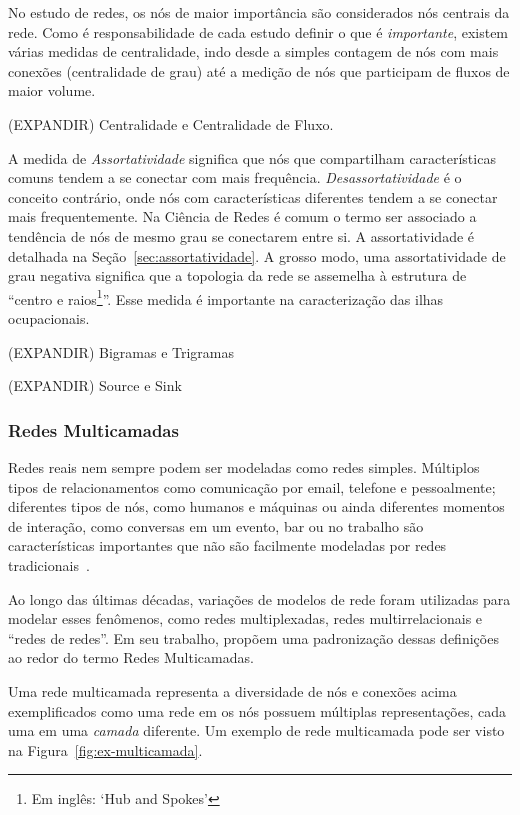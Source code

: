 \documentclass[12pt,a4paper]{article}
\begin{document}
No estudo de redes, os nós de maior importância são considerados nós centrais da rede. Como é responsabilidade de cada estudo definir o que é \textit{importante}, existem várias medidas de centralidade, indo desde a simples contagem de nós com mais conexões (centralidade de grau) até a medição de nós que participam de fluxos de maior volume.


(EXPANDIR) Centralidade e Centralidade de Fluxo.

A medida de \textit{Assortatividade} significa que nós que compartilham características comuns tendem a se conectar com mais frequência. \textit{Desassortatividade} é o conceito contrário, onde nós com características diferentes tendem a se conectar mais frequentemente. Na Ciência de Redes é comum o termo ser associado a tendência de nós de mesmo grau se conectarem entre si. A assortatividade é detalhada na Seção~\ref{sec:assortatividade}. A grosso modo, uma assortatividade de grau negativa significa que a topologia da rede se assemelha à estrutura de \enquote{centro e raios\footnote{Em inglês: \enquote{Hub and Spokes}}}. Esse medida é importante na caracterização das ilhas ocupacionais.

(EXPANDIR) Bigramas e Trigramas

(EXPANDIR) Source e Sink

\subsubsection{Redes Multicamadas} \label{sec:multicamadas}

Redes reais nem sempre podem ser modeladas como redes simples. Múltiplos tipos de relacionamentos como comunicação por email, telefone e pessoalmente; diferentes tipos de nós, como humanos e máquinas ou ainda diferentes momentos de interação, como conversas em um evento, bar ou no trabalho são características importantes que não são facilmente modeladas por redes tradicionais~\cite{Kivela2014-pb}.

Ao longo das últimas décadas, variações de modelos de rede foram utilizadas para modelar esses fenômenos, como redes multiplexadas, redes multirrelacionais e \enquote{redes de redes}. Em seu trabalho,  propõem uma padronização dessas definições ao redor do termo Redes Multicamadas.

Uma rede multicamada representa a diversidade de nós e conexões acima exemplificados como uma rede em os nós possuem múltiplas representações, cada uma em uma \textit{camada} diferente. Um exemplo de rede multicamada pode ser visto na Figura~\ref{fig:ex-multicamada}.
\end{document}
